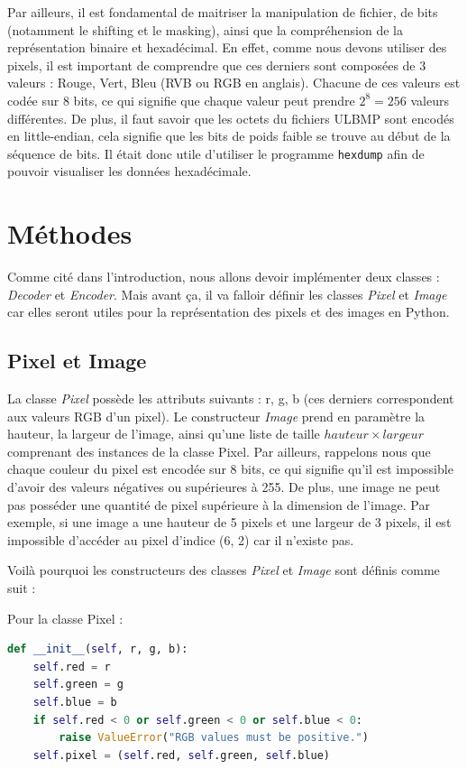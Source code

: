 \documentclass[utf8]{article}
\begin{document}
Par ailleurs, il est fondamental de maitriser la manipulation de fichier, de bits (notamment le shifting et le masking), ainsi que la compréhension de la représentation binaire et hexadécimal. En effet, comme nous devons utiliser des pixels, il est important de comprendre que ces derniers sont composées de 3 valeurs : Rouge, Vert, Bleu (RVB ou RGB en anglais). Chacune de ces valeurs est codée sur 8 bits, ce qui signifie que chaque valeur peut prendre $2^8 = 256$ valeurs différentes. De plus, il faut savoir que les octets du fichiers ULBMP sont encodés en little-endian, cela signifie que les bits de poids faible se trouve au début de la séquence de bits. Il était donc utile d'utiliser le programme \texttt{hexdump} afin de pouvoir visualiser les données hexadécimale.

\section{Méthodes}
Comme cité dans l'introduction, nous allons devoir implémenter deux classes : \textit{Decoder} et \textit{Encoder}. Mais avant ça, il va falloir définir les classes \textit{Pixel} et \textit{Image} car elles seront utiles pour la représentation des pixels et des images en Python.
\subsection{Pixel et Image}
La classe \textit{Pixel} possède les attributs suivants : r, g, b (ces derniers correspondent aux valeurs RGB d'un pixel). 
Le constructeur \textit{Image} prend en paramètre la hauteur, la largeur de l'image, ainsi qu'une liste de taille $hauteur \times largeur$ comprenant des instances de la classe Pixel.
Par ailleurs, rappelons nous que chaque couleur du pixel est encodée sur 8 bits, ce qui signifie qu'il est impossible d'avoir des valeurs négatives ou supérieures à 255. De plus, une image ne peut pas posséder une quantité de pixel supérieure à la dimension de l'image. Par exemple, si une image a une hauteur de 5 pixels et une largeur de 3 pixels, il est impossible d'accéder au pixel d'indice (6, 2) car il n'existe pas.

Voilà pourquoi les constructeurs des classes \textit{Pixel} et \textit{Image} sont définis comme suit :

Pour la classe Pixel : 
\begin{lstlisting}[language=Python, basicstyle=\small]
def __init__(self, r, g, b):
    self.red = r
    self.green = g
    self.blue = b
    if self.red < 0 or self.green < 0 or self.blue < 0:
        raise ValueError("RGB values must be positive.")
    self.pixel = (self.red, self.green, self.blue)
\end{lstlisting}
\end{document}
